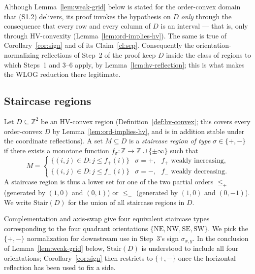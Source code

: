 \begin{remark}\label{rem:wg-needs-hv}
Although Lemma~\ref{lem:weak-grid} below is stated for the order-convex domain
that \textup{(S1.2)} delivers, its proof invokes the hypothesis on $D$
\emph{only} through the consequence that every row and every column of $D$ is
an interval --- that is, only through HV-convexity
(Lemma~\ref{lem:ord-implies-hv}). The same is true of Corollary~\ref{cor:sign}
and of its Claim~\ref{cl:sep}. Consequently the orientation-normalizing
reflections of Step~2 of the proof keep $D$ inside the class of regions to
which Steps~1 and 3--6 apply, by Lemma~\ref{lem:hv-reflection}; this is what
makes the WLOG reduction there legitimate.
\end{remark}

\subsection{Staircase regions}

\begin{definition}\label{def:staircase}
Let $D \subseteq \mathbb{Z}^2$ be an HV-convex region
(Definition~\ref{def:hv-convex}; this covers every order-convex $D$ by
Lemma~\ref{lem:ord-implies-hv}, and is in addition stable under the
coordinate reflections). A set $M \subseteq D$ is a
\emph{staircase region of type} $\sigma\in\{+,-\}$ if there exists a monotone function
$f_\sigma\colon \mathbb{Z}\to\mathbb{Z}\cup\{\pm\infty\}$ such that
\[
M = \begin{cases}
  \{(i,j)\in D : j \le f_+(i)\} & \sigma=+, \text{ $f_+$ weakly increasing}, \\
  \{(i,j)\in D : j \le f_-(i)\} & \sigma=-, \text{ $f_-$ weakly decreasing}.
\end{cases}
\]
A staircase region is thus a lower set for one of the two partial orders
$\le_{+}$ (generated by $(1,0)$ and $(0,1)$) or $\le_{-}$ (generated by $(1,0)$ and
$(0,-1)$). We write $\mathrm{Stair}(D)$ for the union of all staircase regions in $D$.
\end{definition}

\begin{remark}\label{rem:four-orient}
Complementation and axis-swap give four equivalent staircase types corresponding to the
four quadrant orientations $\{\mathrm{NE},\mathrm{NW},\mathrm{SE},\mathrm{SW}\}$. We pick
the $\{+,-\}$ normalization for downstream use in Step~3's sign $\sigma_{x,y}$. In the
conclusion of Lemma~\ref{lem:weak-grid} below, $\mathrm{Stair}(D)$ is understood to
include all four orientations; Corollary~\ref{cor:sign} then restricts to $\{+,-\}$ once
the horizontal reflection has been used to fix a side.
\end{remark}

